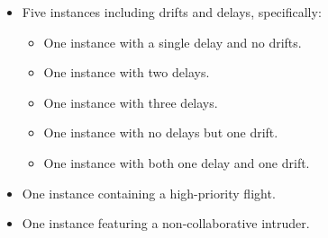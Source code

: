\documentclass[../../thesis.tex]{subfiles}
\begin{document}
\begin{itemize}
    \item Five instances including drifts and delays, specifically:
    \begin{itemize}
        \item One instance with a single delay and no drifts.
        \item One instance with two delays.
        \item One instance with three delays.
        \item One instance with no delays but one drift.
        \item One instance with both one delay and one drift.
    \end{itemize}
    \item One instance containing a high-priority flight.
    \item One instance featuring a non-collaborative intruder.
\end{itemize}
\end{document}
